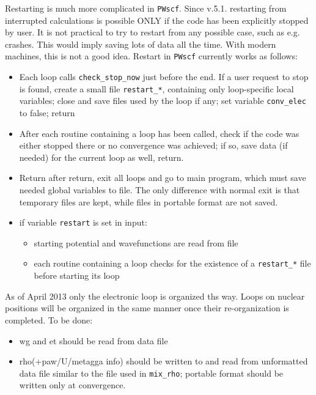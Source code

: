\documentclass[12pt,a4paper]{article}
\begin{document}
Restarting is much more complicated in  \texttt{PWscf}. Since v.5.1.
restarting from interrupted calculations is possible ONLY if the code
has been explicitly stopped by user. It is not practical to try to
restart from any possible case, such as e.g. crashes. This would 
imply saving lots of data all the time. With modern machines, this is
not a good idea. Restart in  \texttt{PWscf} currently works as follows:
\begin{itemize}
\item Each loop calls \texttt{check\_stop\_now} just before the end. 
  If a user request to stop is found, create a small file
  \texttt{restart\_*}, containing only loop-specific local variables; 
  close and save files used by the loop if any; set variable
  \texttt{conv\_elec} to false; return
\item After each routine containing a loop has been called, check if the code
  was either stopped there or no convergence was achieved; if so, save 
  data (if needed) for the current loop as well, return.
\item Return after return, exit all loops and go to main program, which must save
  needed global variables to file. The only difference with normal exit is that
  temporary files are kept, while files in portable format are not saved.
\item if variable \texttt{restart} is set in input:
  \begin{itemize}
  \item starting potential and wavefunctions are read from file
  \item each routine containing a loop checks for the existence of a 
    \texttt{restart\_*} file before starting its loop
  \end{itemize}
\end{itemize}
As of April 2013 only the electronic loop is organized ths way. Loops
on nuclear positions will be organized in the same manner once their
re-organization is completed. To be done:
\begin{itemize}
\item wg and et should be read from data file
\item rho(+paw/U/metagga info) should be written to and read from
  unformatted data file similar to the file used in \texttt{mix\_rho}; 
  portable format should be written only at convergence.
\end{itemize}


\end{document}
